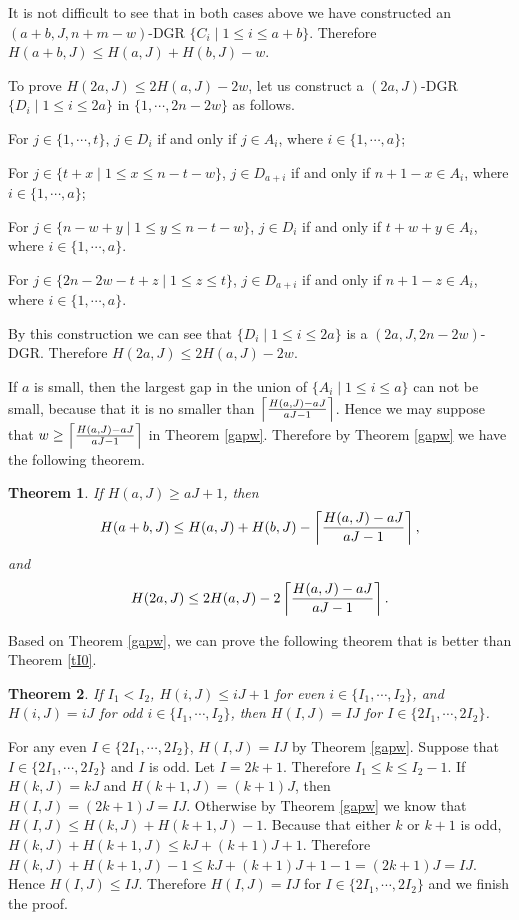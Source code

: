 \documentclass[preprint,12pt]{elsarticle}
\newtheorem{thm}{Theorem}
\begin{document}
\begin{pf}
It is not difficult to see that in both cases above
we have constructed an $(a+b, J, n+m-w)$-DGR
$\{C_i\; |\; 1 \leq i \leq a+b \}$.
Therefore
$H(a+b,J) \leq H(a,J) + H(b,J) - w$.


To prove $H(2a,J) \leq 2H(a,J) - 2w$, let us construct
a $(2a, J)$-DGR $\{D_i\; |\; 1 \leq i \leq 2a\}$ in $\{1, \cdots, 2n-2w \}$ as follows.

For $j \in \{1, \cdots, t\}$, $j \in D_i$ if and only if $j \in A_i$, where $i \in \{1, \cdots, a\}$;

For $j \in \{t+x \; |\; 1 \leq x \leq n-t-w \}$, $j \in D_{a+i}$ if and only if $n+1-x \in A_i$, where $i \in \{1, \cdots, a\}$;

For $j \in \{n-w+y \; |\; 1 \leq y \leq n-t-w \}$, $j \in D_i$ if and only if $t+w+y \in A_i$, where $i \in \{1, \cdots, a\}$.

For $j \in \{2n-2w-t+z \; |\; 1 \leq z \leq t \}$, $j \in D_{a+i}$ if and only if $n+1-z \in A_i$, where $i \in \{1, \cdots, a\}$.

By this construction we can see that $\{D_i\; |\; 1 \leq i \leq 2a\}$ is a $(2a, J, 2n-2w)$-DGR.
Therefore $H(2a,J) \leq 2H(a,J) - 2w$.
\end{pf}



If $a$ is small, then the largest gap in the union of $\{A_i\; | \;1 \leq i \leq a\}$ can not be small, because that it is no smaller than $\left\lceil{H(a,J) -aJ \over {aJ-1}}\right\rceil$. Hence we may suppose that $w \ge \left\lceil{{H(a,J) -aJ} \over {aJ-1}}\right\rceil$ in Theorem \ref{gapw}.
Therefore by Theorem \ref{gapw} we have the following theorem.


\begin{thm} \label{gapwcoro}
If $H(a,J) \geq aJ+1$, then
$$H(a+b,J) \leq H(a,J) + H(b,J) - \left\lceil{{H(a,J) -aJ} \over {aJ-1}}\right\rceil,$$
and
$$H(2a,J) \leq 2H(a,J) - 2\left\lceil{{H(a,J) -aJ} \over {aJ-1}}\right\rceil.$$
\end{thm}






Based on Theorem \ref{gapw}, we can prove the following theorem that is better than Theorem \ref{tI0}.

\begin{thm} \label{almosttoregular}
If $I_1 < I_2$,
$H(i,J) \le iJ+1$ for even $i \in \{I_1, \cdots, I_2\}$,
and $H(i,J) = iJ$ for odd $i \in \{I_1, \cdots, I_2\}$,
then $H(I,J) = IJ$ for $I \in \{2I_1, \cdots, 2I_2\}$.
\end{thm}
\begin{pf}
For any even $I \in \{2I_1, \cdots, 2I_2\}$, $H(I,J) = IJ$ by Theorem \ref{gapw}.
Suppose that $I \in \{2I_1, \cdots, 2I_2\}$ and $I$ is odd. Let $I = 2k+1$. Therefore $I_1 \le k \le I_2 - 1$.
If $H(k,J) = kJ$ and $H(k+1,J) = (k+1)J$, then $H(I,J) = (2k+1)J = IJ$.
Otherwise by Theorem \ref{gapw} we know that $H(I,J) \le H(k,J) + H(k+1,J) - 1$.
Because that either $k$ or $k+1$ is odd,
$H(k,J) + H(k+1,J) \le kJ + (k+1)J +1$.
Therefore
$H(k,J) + H(k+1,J) - 1 \le kJ + (k+1)J +1 -1 = (2k+1)J = IJ$. Hence $H(I,J) \le IJ$.
Therefore $H(I,J) = IJ$ for $I \in \{2I_1, \cdots, 2I_2\}$ and we finish the proof.
\end{pf}
\end{document}
